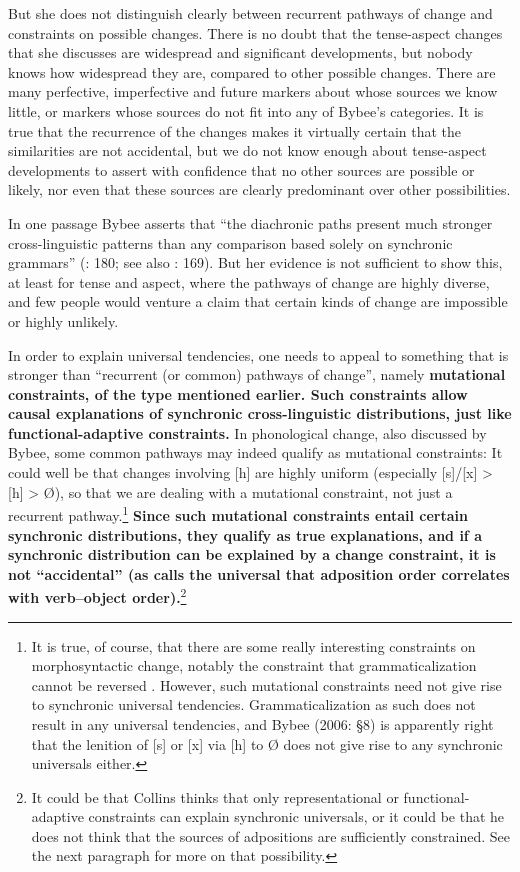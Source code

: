 \documentclass[output=paper]{langsci/langscibook}
\begin{document}
 
But she does not distinguish clearly between recurrent pathways of change and constraints on possible changes. There is no doubt that the tense-aspect changes that she discusses are widespread and significant developments, but nobody knows how widespread they are, compared to other possible changes. There are many perfective, imperfective and future markers about whose sources we know little, or markers whose sources do not fit into any of Bybee’s categories. It is true that the recurrence of the changes makes it virtually certain that the similarities are not accidental, but we do not know enough about tense-aspect developments to assert with confidence that no other sources are possible or likely, nor even that these sources are clearly predominant over other possibilities. 
 
In one passage Bybee asserts that “the diachronic paths present much stronger cross-linguistic patterns than any comparison based solely on synchronic grammars” (\citeyear{Bybee2006}: 180; see also \citealt{Bybee2008}: 169). But her evidence is not sufficient to show this, at least for tense and aspect, where the pathways of change are highly diverse, and few people would venture a claim that certain kinds of change are impossible or highly unlikely. 
 
In order to explain universal tendencies, one needs to appeal to something that is stronger than “recurrent (or common) pathways of change”, namely \textbf{{mutational constraints, of the type mentioned earlier. Such constraints allow causal explanations of synchronic cross-linguistic distributions, just like functional-adaptive constraints.} }In phonological change, also discussed by Bybee, some common pathways may indeed qualify as mutational constraints: It could well be that changes involving [h] are highly uniform (especially [s]/[x] > [h] > Ø), so that we are dealing with a mutational constraint, not just a recurrent pathway.\footnote{It is true, of course, that there are some really interesting constraints on morphosyntactic change, notably the constraint that grammaticalization cannot be reversed \citep{Haspelmath1999_Irrev}. However, such mutational constraints need not give rise to synchronic universal tendencies. Grammaticalization as such does not result in any universal tendencies, and Bybee (2006: §8) is apparently right that the lenition of [s] or [x] via [h] to Ø does not give rise to any synchronic universals either.}\textbf{{ Since such mutational constraints entail certain synchronic distributions, they qualify as true explanations, and if a synchronic distribution can be explained by a change constraint, it is not “accidental” (as  calls the universal that adposition order correlates with verb–object order).}}\footnote{It could be that Collins thinks that only representational or functional-adaptive constraints can explain synchronic universals, or it could be that he does not think that the sources of adpositions are sufficiently constrained. See the next paragraph for more on that possibility.}
 
\end{document}
